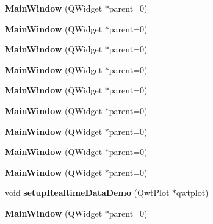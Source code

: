 \begin{DoxyCompactItemize}
\item 
\mbox{\label{class_main_window_a8b244be8b7b7db1b08de2a2acb9409db}} 
{\bfseries Main\+Window} (Q\+Widget $\ast$parent=0)
\item 
\mbox{\label{class_main_window_a8b244be8b7b7db1b08de2a2acb9409db}} 
{\bfseries Main\+Window} (Q\+Widget $\ast$parent=0)
\item 
\mbox{\label{class_main_window_a8b244be8b7b7db1b08de2a2acb9409db}} 
{\bfseries Main\+Window} (Q\+Widget $\ast$parent=0)
\item 
\mbox{\label{class_main_window_a8b244be8b7b7db1b08de2a2acb9409db}} 
{\bfseries Main\+Window} (Q\+Widget $\ast$parent=0)
\item 
\mbox{\label{class_main_window_a8b244be8b7b7db1b08de2a2acb9409db}} 
{\bfseries Main\+Window} (Q\+Widget $\ast$parent=0)
\item 
\mbox{\label{class_main_window_a8b244be8b7b7db1b08de2a2acb9409db}} 
{\bfseries Main\+Window} (Q\+Widget $\ast$parent=0)
\item 
\mbox{\label{class_main_window_a8b244be8b7b7db1b08de2a2acb9409db}} 
{\bfseries Main\+Window} (Q\+Widget $\ast$parent=0)
\item 
\mbox{\label{class_main_window_a8b244be8b7b7db1b08de2a2acb9409db}} 
{\bfseries Main\+Window} (Q\+Widget $\ast$parent=0)
\item 
\mbox{\label{class_main_window_a8b244be8b7b7db1b08de2a2acb9409db}} 
{\bfseries Main\+Window} (Q\+Widget $\ast$parent=0)
\item 
\mbox{\label{class_main_window_af957e9ef6d186377bed09b9f3211f58f}} 
void {\bfseries setup\+Realtime\+Data\+Demo} (Qwt\+Plot $\ast$qwtplot)
\item 
\mbox{\label{class_main_window_a8b244be8b7b7db1b08de2a2acb9409db}} 
{\bfseries Main\+Window} (Q\+Widget $\ast$parent=0)
\item 

\end{DoxyCompactItemize}
